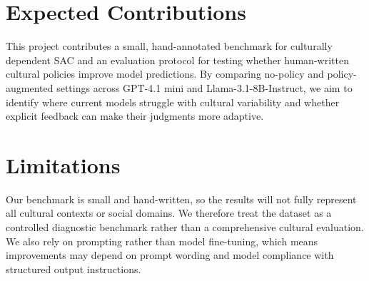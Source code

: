 \documentclass[11pt]{article}
\begin{document}
\section{Expected Contributions}
This project contributes a small, hand-annotated benchmark for culturally dependent SAC and an evaluation protocol for testing whether human-written cultural policies improve model predictions. By comparing no-policy and policy-augmented settings across GPT-4.1 mini and Llama-3.1-8B-Instruct, we aim to identify where current models struggle with cultural variability and whether explicit feedback can make their judgments more adaptive.

\section*{Limitations}
Our benchmark is small and hand-written, so the results will not fully represent all cultural contexts or social domains. We therefore treat the dataset as a controlled diagnostic benchmark rather than a comprehensive cultural evaluation. We also rely on prompting rather than model fine-tuning, which means improvements may depend on prompt wording and model compliance with structured output instructions.


\end{document}
